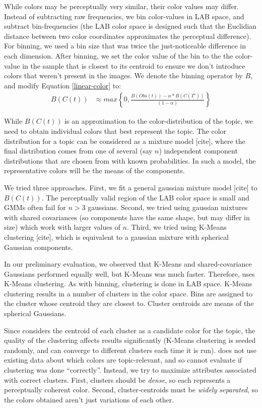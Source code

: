 While colors may be perceptually very similar, their color values may differ. Instead of subtracting raw frequencies, we bin color-values in LAB space, and subtract bin-frequencies (the LAB color space is designed such that the Euclidian distance between two color coordinates approximates the perceptual difference). For binning, we used a bin size that was twice the just-noticeable difference in each dimension. After binning, we set the color value of the bin to the the color-value in the sample that is closest to its centroid to ensure we don't introduce colors that weren't present in the images. We denote the binning operator by $B$, and modify Equation \ref{linear-color} to:
\begin{align}
\label{linear-color-bin}  
B(C(t)) &\approx max\left\{0,\frac{B(Obs(t)) - \alpha*B(C(T'))}{(1-\alpha)}\right\}
\end{align}

While $B(C(t))$ is an approximation to the color-distribution of the topic, we need to obtain individual colors that best represent the topic. The color distribution for a topic can be considered as a mixture model [cite], where the final distribution comes from one of several (say $n$) independent component distributions that are chosen from with known probabilities. In such a model, the representative colors will be the means of the components. 

We tried three approaches. First, we fit a general gaussian mixture model [cite] to $B(C(t))$. The perceptually valid region of the LAB color space is small and GMMs often fail for $n>3$ gaussians. Second, we tried using gaussian mixtures with shared covariances (so components have the same shape, but may differ in size) which work with larger values of $n$. Third, we tried using K-Means clustering [cite], which is equivalent to a gaussian mixture with spherical Gaussian components. 

In our preliminary evaluation, we observed that K-Means and shared-covariance Gaussians performed equally well, but K-Means was much faster. Therefore, \system uses K-Means clustering. As with binning, clustering is done in LAB space. K-Means clustering results in a number of clusters in the color space. Bins are assigned to the cluster whose centroid they are closest to. Cluster centroids are means of the spherical Gaussians.

Since \system considers the centroid of each cluster as a candidate color for the topic, the quality of the clustering affects results significantly (K-Means clustering is seeded randomly, and can converge to different clusters each time it is run). \system does not use existing data about which colors are topic-relevant, and so cannot evaluate if clustering was done ``correctly''. Instead, we try to maximize attributes associated with correct clusters. First, clusters should be \textit{dense}, so each represents a perceptually coherent color. Second, cluster-centroids must be \textit{widely separated}, so the colors obtained aren't just variations of each other. 

